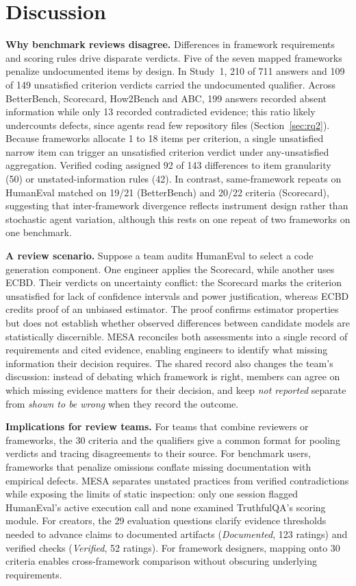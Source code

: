\documentclass[10pt,conference]{IEEEtran}
\begin{document}
\section{Discussion}
\textbf{Why benchmark reviews disagree.} Differences in framework requirements and scoring rules drive disparate verdicts. Five of the seven mapped frameworks penalize undocumented items by design. In Study~1, 210 of 711 answers and 109 of 149 unsatisfied criterion verdicts carried the undocumented qualifier. Across BetterBench, Scorecard, How2Bench and ABC, 199 answers recorded absent information while only 13 recorded contradicted evidence; this ratio likely undercounts defects, since agents read few repository files (Section~\ref{sec:rq2}). Because frameworks allocate 1 to 18 items per criterion, a single unsatisfied narrow item can trigger an unsatisfied criterion verdict under any-unsatisfied aggregation. Verified coding assigned 92 of 143 differences to item granularity (50) or unstated-information rules (42). In contrast, same-framework repeats on HumanEval matched on 19/21 (BetterBench) and 20/22 criteria (Scorecard), suggesting that inter-framework divergence reflects instrument design rather than stochastic agent variation, although this rests on one repeat of two frameworks on one benchmark.

\textbf{A review scenario.} Suppose a team audits HumanEval to select a code generation component. One engineer applies the Scorecard, while another uses ECBD. Their verdicts on uncertainty conflict: the Scorecard marks the criterion unsatisfied for lack of confidence intervals and power justification, whereas ECBD credits proof of an unbiased estimator. The proof confirms estimator properties but does not establish whether observed differences between candidate models are statistically discernible. MESA reconciles both assessments into a single record of requirements and cited evidence, enabling engineers to identify what missing information their decision requires. The shared record also changes the team's discussion: instead of debating which framework is right, members can agree on which missing evidence matters for their decision, and keep \emph{not reported} separate from \emph{shown to be wrong} when they record the outcome.

\textbf{Implications for review teams.} For teams that combine reviewers or frameworks, the 30 criteria and the qualifiers give a common format for pooling verdicts and tracing disagreements to their source. For benchmark users, frameworks that penalize omissions conflate missing documentation with empirical defects. MESA separates unstated practices from verified contradictions while exposing the limits of static inspection: only one session flagged HumanEval's active execution call and none examined TruthfulQA's scoring module. For creators, the 29 evaluation questions clarify evidence thresholds needed to advance claims to documented artifacts (\emph{Documented}, 123 ratings) and verified checks (\emph{Verified}, 52 ratings). For framework designers, mapping onto 30 criteria enables cross-framework comparison without obscuring underlying requirements.
\end{document}
